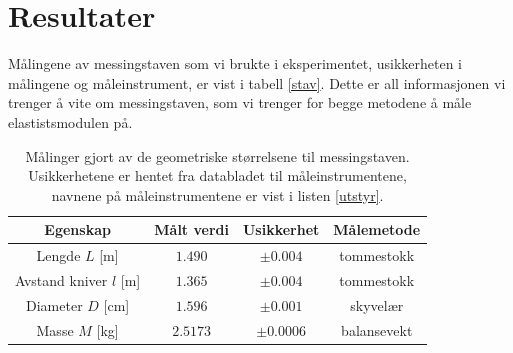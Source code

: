 \documentclass[%
 reprint,
 amsmath,amssymb,
 aps,
]{revtex4-1}
\begin{document}
\section{Resultater}
Målingene av messingstaven som vi brukte i eksperimentet, usikkerheten i målingene og måleinstrument, er vist i tabell \vref{stav}. Dette er all informasjonen vi trenger å vite om messingstaven, som vi trenger for begge metodene å måle elastistsmodulen på.
\begin{table}[h!]
\centering
\caption{Målinger gjort av de geometriske størrelsene til messingstaven. Usikkerhetene er hentet fra databladet til måleinstrumentene, navnene på måleinstrumentene er vist i listen \vref{utstyr}.}
\label{stav}
\begin{tabular}{cccc}
    Egenskap & Målt verdi      &    Usikkerhet & Målemetode \\
    \hline
    Lengde $L$ [m] & $1.490$    & $\pm 0.004$  & tommestokk  \\
    Avstand kniver $l$ [m] & $1.365$ & $\pm0.004$ & tommestokk \\
    Diameter $D$ [cm] & $1.596$    & $\pm0.001$ & skyvelær    \\
    Masse $M$    [kg]  & $2.5173$   & $\pm0.0006$   & balansevekt \\  \hline
\end{tabular}
\end{table}
\end{document}
